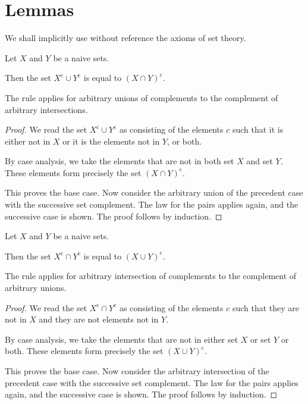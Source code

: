 \section{Lemmas}

We shall implicitly use without reference the axioms of set theory. 

\begin{lemma}
    \label{lemma-de-morgan-first}
    Let $X$ and $Y$ be a naive sets.
    
    Then the set $X^\mathrm{c} \cup Y^\mathrm{c}$ is equal to $(X \cap Y)^\mathrm{c}$.

    The rule applies for arbitrary unions of complements to the complement of arbitrary intersections.
\end{lemma}

\begin{proof}
    We read the set $X^\mathrm{c} \cup Y^\mathrm{c}$ as consisting of the elements $c$ such that it is either not in $X$ or it is the elements not in $Y$, or both.

    By case analysis, we take the elements that are not in both set $X$ and set $Y$. These elements form precisely the set $(X \cap Y)^\mathrm{c}$.

    This proves the base case. Now consider the arbitrary union of the precedent case with the successive set complement. The law for the pairs applies again, and the successive case is shown. The proof follows by induction.
\end{proof}

\begin{lemma}
    \label{lemma-de-morgan-second}
    Let $X$ and $Y$ be a naive sets.
    
    Then the set $X^\mathrm{c} \cap Y^\mathrm{c}$ is equal to $(X \cup Y)^\mathrm{c}$.

    The rule applies for arbitrary intersection of complements to the complement of arbitrary unions.
\end{lemma}

\begin{proof}
    We read the set $X^\mathrm{c} \cap Y^\mathrm{c}$ as consisting of the elements $c$ such that they are not in $X$ and they are not elements not in $Y$.

    By case analysis, we take the elements that are not in either set $X$ or set $Y$ or both. These elements form precisely the set $(X \cup Y)^\mathrm{c}$.

    This proves the base case. Now consider the arbitrary intersection of the precedent case with the successive set complement. The law for the pairs applies again, and the successive case is shown. The proof follows by induction.
\end{proof}
